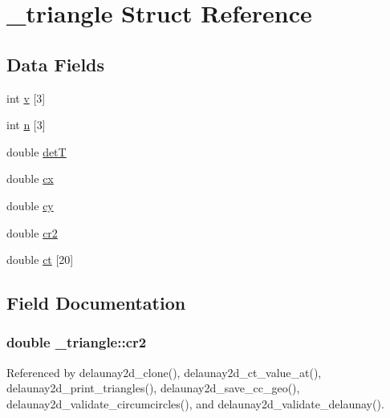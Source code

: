 \hypertarget{struct__triangle}{}\section{\+\_\+triangle Struct Reference}
\label{struct__triangle}
\subsection*{Data Fields}
\begin{DoxyCompactItemize}
\item 
int \hyperlink{struct__triangle_a7d27d9b4cf5c1d23c396bdaa90113f28}{v} \mbox{[}3\mbox{]}
\item 
int \hyperlink{struct__triangle_ab7ec3e27930817427786c8bcd35b6736}{n} \mbox{[}3\mbox{]}
\item 
double \hyperlink{struct__triangle_ab1c37cf46e2e159fce60bf11e03e767a}{detT}
\item 
double \hyperlink{struct__triangle_a615e8f4d7d77ae63b3021b3fed607e9b}{cx}
\item 
double \hyperlink{struct__triangle_a3bbbdfc71a9c2956babf06fd57e7e8c1}{cy}
\item 
double \hyperlink{struct__triangle_a407b88f560c64e76bb484c08aa025b48}{cr2}
\item 
double \hyperlink{struct__triangle_a10d65266a21950269603b53b9ecdc533}{ct} \mbox{[}20\mbox{]}
\end{DoxyCompactItemize}


\subsection{Field Documentation}
\subsubsection[{\texorpdfstring{cr2}{cr2}}]{\setlength{\rightskip}{0pt plus 5cm}double \+\_\+triangle\+::cr2}\hypertarget{struct__triangle_a407b88f560c64e76bb484c08aa025b48}{}\label{struct__triangle_a407b88f560c64e76bb484c08aa025b48}


Referenced by delaunay2d\+\_\+clone(), delaunay2d\+\_\+ct\+\_\+value\+\_\+at(), delaunay2d\+\_\+print\+\_\+triangles(), delaunay2d\+\_\+save\+\_\+cc\+\_\+geo(), delaunay2d\+\_\+validate\+\_\+circumcircles(), and delaunay2d\+\_\+validate\+\_\+delaunay().

